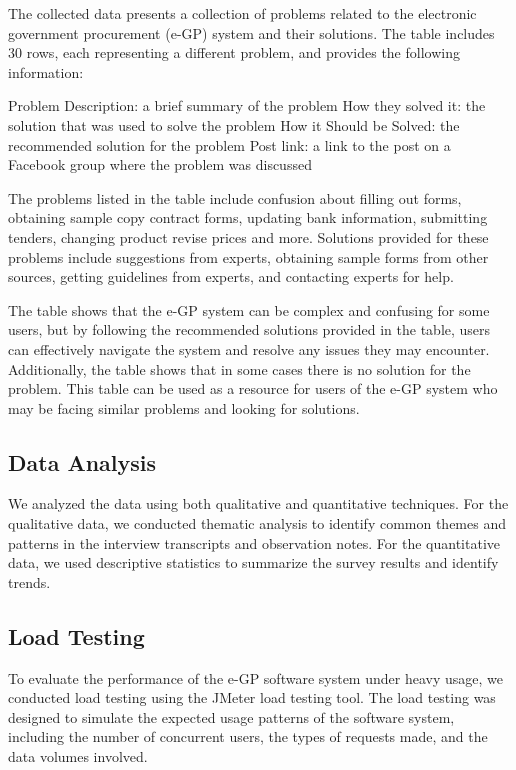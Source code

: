 \documentclass{report}
\begin{document}
The collected data presents a collection of problems related to the electronic government procurement (e-GP) system and their solutions. 
The table includes 30 rows, each representing a different problem, and provides the following information:

Problem Description: a brief summary of the problem
How they solved it: the solution that was used to solve the problem
How it Should be Solved: the recommended solution for the problem
Post link: a link to the post on a Facebook group where the problem was discussed

The problems listed in the table include confusion about filling out forms, obtaining sample copy contract forms, updating bank information, submitting tenders, changing product revise prices and more. Solutions provided for these problems include suggestions from experts, obtaining sample forms from other sources, getting guidelines from experts, and contacting experts for help.

The table shows that the e-GP system can be complex and confusing for some users, but by following the recommended solutions provided in the table, users can effectively navigate the system and resolve any issues they may encounter. Additionally, the table shows that in some cases there is no solution for the problem. This table can be used as a resource for users of the e-GP system who may be facing similar problems and looking for solutions.


\subsection{Data Analysis}

We analyzed the data using both qualitative and quantitative techniques. For the qualitative data, we conducted thematic analysis to identify common themes and patterns in the interview transcripts and observation notes. For the quantitative data, we used descriptive statistics to summarize the survey results and identify trends.



\subsection{Load Testing}

To evaluate the performance of the e-GP software system under heavy usage, we conducted load testing using the JMeter load testing tool. The load testing was designed to simulate the expected usage patterns of the software system, including the number of concurrent users, the types of requests made, and the data volumes involved.
\end{document}
